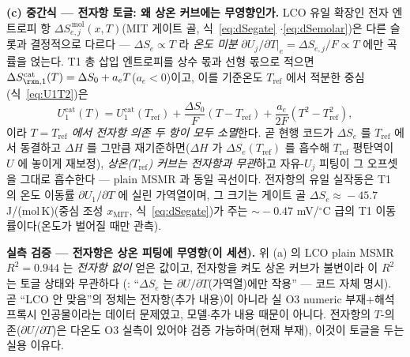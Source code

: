 \textbf{(c) 중간식 --- 전자항 토글: 왜 상온 커브에는 무영향인가.}
LCO 유일 확장인 전자 엔트로피 항 $\Delta S_{e,j}^{\,\mathrm{mol}}(x,T)$(MIT 게이트 골, 식~\eqref{eq:dSegate}
$\cdot$\eqref{eq:dSemolar})은 다른 슬롯과 결정적으로 다르다 --- $\Delta S_e\!\propto\!T$ 라 \emph{온도 미분}
$\partial U_j/\partial T|_e=\Delta S_{e,j}/F\!\propto\!T$ 에만 곡률을 얹는다. T1 총 삽입 엔트로피를 상수 몫과
선형 몫으로 적으면 $\Delta S_{\rxn,1}^\mathrm{cat}(T)=\Delta S_0+a_e T$($a_e<0$)이고, 이를 기준온도
$T_\mathrm{ref}$ 에서 적분한 중심(식~\eqref{eq:U1T2})은
\begin{equation}
U_1^\mathrm{cat}(T)=U_1^\mathrm{cat}(T_\mathrm{ref})+\frac{\Delta S_0}{F}(T-T_\mathrm{ref})
+\frac{a_e}{2F}(T^2-T_\mathrm{ref}^2),
\label{eq:lcoom-U1T}
\end{equation}
이라 \emph{$T\!=\!T_\mathrm{ref}$ 에서 전자항 의존 두 항이 모두 소멸}한다. 곧 현행 코드가 $\Delta S_e$ 를
$T_\mathrm{ref}$ 에서 동결하고 $\Delta H$ 를 그만큼 재기준하면($\Delta H$ 가 $\Delta S_e(T_\mathrm{ref})$ 를
흡수해 $T_\mathrm{ref}$ 평탄역이 $U$ 에 놓이게 재보정), \emph{상온($T_\mathrm{ref}$) 커브는 전자항과
무관}하고 자유-$U_j$ 피팅이 그 오프셋을 그대로 흡수한다 --- plain MSMR 과 동일 곡선이다. 전자항의 유일
실작동은 T1 의 온도 이동률 $\partial U_1/\partial T$ 에 실린 가역열이며, 그 크기는 게이트 골
$\Delta S_e\!\approx\!-45.7$ J/(mol\,K)(중심 조성 $x_\mathrm{MIT}$, 식~\eqref{eq:dSegate})가 주는
$\sim\!-0.47$ mV/$^\circ$C 급의 T1 이동률이다(온도가 벌어질 때만 관측).

\begin{verifybox}
\textbf{실측 검증 --- 전자항은 상온 피팅에 무영향(이 세션).} 위 (a) 의 LCO plain MSMR $R^2\!=\!0.944$ 는
\emph{전자항 없이} 얻은 값이고, 전자항을 켜도 상온 커브가 불변이라 이 $R^2$ 는 토글 상태와 무관하다
(: ``$\Delta S_e$ 는 $\partial U/\partial T$(가역열)에만 작용'' --- 코드 자체 명시).
곧 ``LCO 안 맞음''의 정체는 전자항(추가 내용)이 아니라 실 O3 numeric 부재$+$해석 프록시 인공물이라는
데이터 문제였고, 모델$\cdot$추가 내용 때문이 아니다. 전자항의 $T$-의존($\partial U/\partial T$)은 다온도 O3
실측이 있어야 검증 가능하며(현재 부재), 이것이 토글을 두는 실용 이유다.
\end{verifybox}

